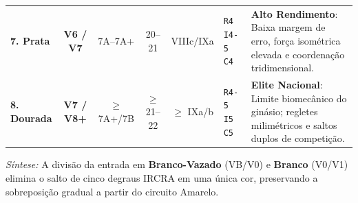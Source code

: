 \begin{table}[!htbp]
\begin{tabularx}{\linewidth}{p{2.55cm}ccccp{1.8cm}X}
\rowcolor{rowgray}
\colorbox{tagsilver}{\strut\color{black}\textbf{7. Prata}} & \textbf{V6 / V7} & 7A--7A+ & 20--21 & VIIIc/IXa & \texttt{R4 I4-5 C4} & \textbf{Alto Rendimento}: Baixa margem de erro, força isométrica elevada e coordenação tridimensional. \\
\colorbox{taggold}{\strut\color{black}\textbf{8. Dourada}} & \textbf{V7 / V8+} & $\ge$ 7A+/7B & $\ge$ 21--22 & $\ge$ IXa/b & \texttt{R4-5 I5 C5} & \textbf{Elite Nacional}: Limite biomecânico do ginásio; regletes milimétricos e saltos duplos de competição. \\
\bottomrule
\end{tabularx}
\end{table}

\noindent\textit{Síntese:} A divisão da entrada em \textbf{Branco-Vazado} (VB/V0) e \textbf{Branco} (V0/V1) elimina o salto de cinco degraus IRCRA em uma única cor, preservando a sobreposição gradual a partir do circuito Amarelo.
